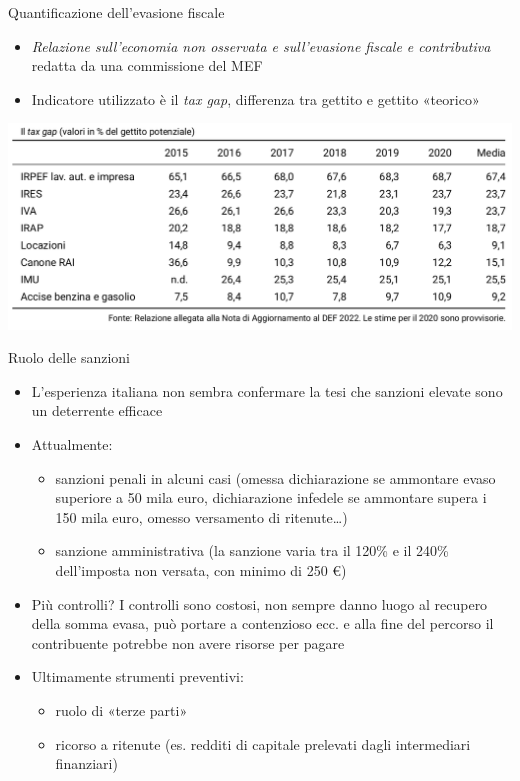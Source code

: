 \documentclass[11pt]{beamer}
\begin{document}
\begin{frame}{Quantificazione dell'evasione fiscale}
\begin{itemize}
\item \emph{Relazione sull'economia non osservata e sull'evasione fiscale e
contributiva} redatta da una commissione del MEF
\item Indicatore utilizzato è il \emph{tax gap}, differenza tra gettito e gettito
«teorico»
\end{itemize}

\begin{center}
\includegraphics[width=.9\linewidth]{./figure/tax-gap.png}
\end{center}  
\end{frame}

\begin{frame}{Ruolo delle sanzioni}
\begin{itemize}
\item L'esperienza italiana non sembra confermare la tesi che sanzioni elevate
sono un deterrente efficace
\item Attualmente:
\begin{itemize}
\item sanzioni penali in alcuni casi (omessa dichiarazione se ammontare evaso
superiore a 50 mila euro, dichiarazione infedele se ammontare supera i 150
mila euro, omesso versamento di ritenute\ldots{})
\item sanzione amministrativa (la sanzione varia tra il 120\% e il 240\%
dell'imposta non versata, con minimo di 250 €)
\end{itemize}
\item Più controlli? I controlli sono costosi, non sempre danno luogo al recupero
della somma evasa, può portare a contenzioso ecc. e alla fine del percorso
il contribuente potrebbe non avere risorse per pagare
\item Ultimamente strumenti preventivi:
\begin{itemize}
\item ruolo di «terze parti»
\item ricorso a ritenute (es. redditi di capitale prelevati dagli intermediari
finanziari)
\end{itemize}
\end{itemize}
\end{frame}
\end{document}
